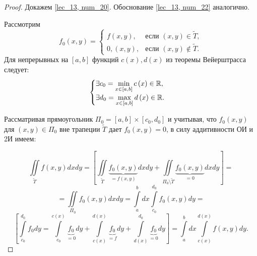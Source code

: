 \documentclass[../../main.tex]{subfiles}
\begin{document}
\begin{proof}
	Докажем \eqref {lec_13, num_20}. Обоснование \eqref {lec_13, num_22}
	аналогично.
	
	Рассмотрим 
	\[ 
	f_0 \left( x, y \right) =  
	\begin{cases}
	f \left( x, y \right), &\text{если } \left( x, y \right)
	\in \widetilde{T}, \\
	0, \left( x, y \right), &\text{если } \left( x, y \right)
	\notin \widetilde{T}.
	\end{cases}
	\]
	Для непрерывных на $ \left[ a, b \right] $ функций 
	$ c \left( x \right), d \left( x \right) $ из теоремы Вейерштрасса следует:
	\[\begin{cases}
	\exists c_0 = 
	\min\limits_{x \in \left[ a, b \right] } c \left( x \right) \in \mathbb{R}, \\
	\exists d_0 = \max\limits_{x \in \left[a, b \right] } d \left(x\right) \in \mathbb{R}.
	\end{cases}\]
	
	Рассматривая прямоугольник $\Pi_0 = \left[ a, b \right] \times 
	\left[ c_0, d_0 \right]  $ и учитывая, что $ f_0 \left( x, y \right) $ для 
	$ \left( x, y \right) \in \Pi_0 $ вне трапеции $\widetilde{T}$ дает
	$ f_0 \left( x, y \right) = 0 $, в силу аддитивности ОИ и 2И имеем:
	
	\[
	\iint\limits_{ \widetilde{T} } f \left( x, y \right) dx dy = \left[
	\iint\limits_{ \widetilde{T} } 
	\underbrace{f_0 \left( x, y \right)}_{= f \left( x, y \right)} dx dy
    +
	\iint\limits_{ \Pi_0 \setminus \widetilde{T} }
	\underbrace{f_0 \left( x, y \right)}_{= 0} dx dy
	\right] =
	\]
	\[
	= \iint\limits_{ \Pi_0} f_0 \left( x, y \right) dx dy = 
	\int\limits_a^b dx
	\int\limits_{c_0}^{d_0} f_0 \left( x, y \right) dy = 
	\]
	\[
	\left[ \int\limits_{c_0}^{d_0} f_0 dy =
	 \int\limits_{c_0} ^ {c \left( x \right) } 
	\underbrace{f_0}_{ = 0}  dy + 
	\int\limits_{c \left( x \right) } ^ {d \left( x \right) } 
	\underbrace{f_0}_{ = f} dy +
	 \int\limits_{d \left( x \right) } ^ {d_0} 
	\underbrace{f_0}_{ = 0} dy \right] = 
	\int\limits_a^b dx \int\limits_{c \left( x \right) } ^
	{d \left( x \right) } f \left( x, y \right) dy.
	\]
\end{proof}
\end{document}

